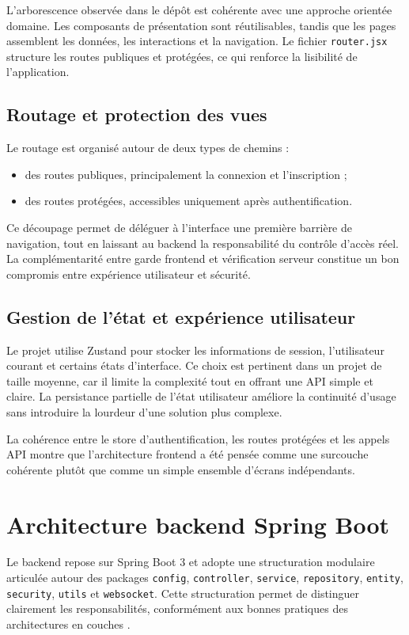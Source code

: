 L'arborescence observée dans le dépôt est cohérente avec une approche orientée domaine. Les composants de présentation sont réutilisables, tandis que les pages assemblent les données, les interactions et la navigation. Le fichier \texttt{router.jsx} structure les routes publiques et protégées, ce qui renforce la lisibilité de l'application.

\subsection{Routage et protection des vues}
Le routage est organisé autour de deux types de chemins :
\begin{itemize}
  \item des routes publiques, principalement la connexion et l'inscription ;
  \item des routes protégées, accessibles uniquement après authentification.
\end{itemize}

Ce découpage permet de déléguer à l'interface une première barrière de navigation, tout en laissant au backend la responsabilité du contrôle d'accès réel. La complémentarité entre garde frontend et vérification serveur constitue un bon compromis entre expérience utilisateur et sécurité.

\subsection{Gestion de l'état et expérience utilisateur}
Le projet utilise Zustand pour stocker les informations de session, l'utilisateur courant et certains états d'interface. Ce choix est pertinent dans un projet de taille moyenne, car il limite la complexité tout en offrant une API simple et claire. La persistance partielle de l'état utilisateur améliore la continuité d'usage sans introduire la lourdeur d'une solution plus complexe.

\begin{codeblock}[H]
\caption{Gestion centralisée de l'authentification côté frontend}

\end{codeblock}

La cohérence entre le store d'authentification, les routes protégées et les appels API montre que l'architecture frontend a été pensée comme une surcouche cohérente plutôt que comme un simple ensemble d'écrans indépendants.

\section{Architecture backend Spring Boot}
Le backend repose sur Spring Boot 3 et adopte une structuration modulaire articulée autour des packages \texttt{config}, \texttt{controller}, \texttt{service}, \texttt{repository}, \texttt{entity}, \texttt{security}, \texttt{utils} et \texttt{websocket}. Cette structuration permet de distinguer clairement les responsabilités, conformément aux bonnes pratiques des architectures en couches \cite{fowler2002,springdocs}.

